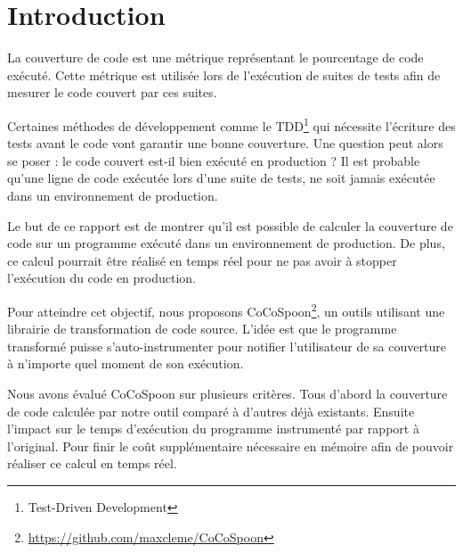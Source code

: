 \chapter*{Introduction}
	\thispagestyle{introduction}

La couverture de code est une métrique représentant le pourcentage de code exécuté. Cette métrique est utilisée lors de l'exécution de suites de tests afin de mesurer le code couvert par ces suites. 

Certaines méthodes de développement comme le TDD\footnote{Test-Driven Development} qui nécessite l'écriture des tests avant le code vont garantir une bonne couverture. Une question peut alors se poser : le code couvert est-il bien exécuté en production ? Il est probable qu’une ligne de code exécutée lors d’une suite de tests, ne soit jamais exécutée dans un environnement de production. 

Le but de ce rapport est de montrer qu'il est possible de calculer la couverture de code sur un programme exécuté dans un environnement de production. De plus, ce calcul pourrait être réalisé en temps réel pour ne pas avoir à stopper l’exécution du code en production.

Pour atteindre cet objectif, nous proposons CoCoSpoon\footnote{\url{https://github.com/maxcleme/CoCoSpoon}}, un outils utilisant une librairie de transformation de code source. L’idée est que le programme transformé puisse s’auto-instrumenter pour notifier l’utilisateur de sa couverture à n'importe quel moment de son exécution.

Nous avons évalué CoCoSpoon sur plusieurs critères. Tous d’abord la couverture de code calculée par notre outil comparé à d’autres déjà existants. Ensuite l’impact sur le temps d’exécution du programme instrumenté par rapport à l’original. Pour finir le coût supplémentaire nécessaire en mémoire afin de pouvoir réaliser ce calcul en temps réel.

